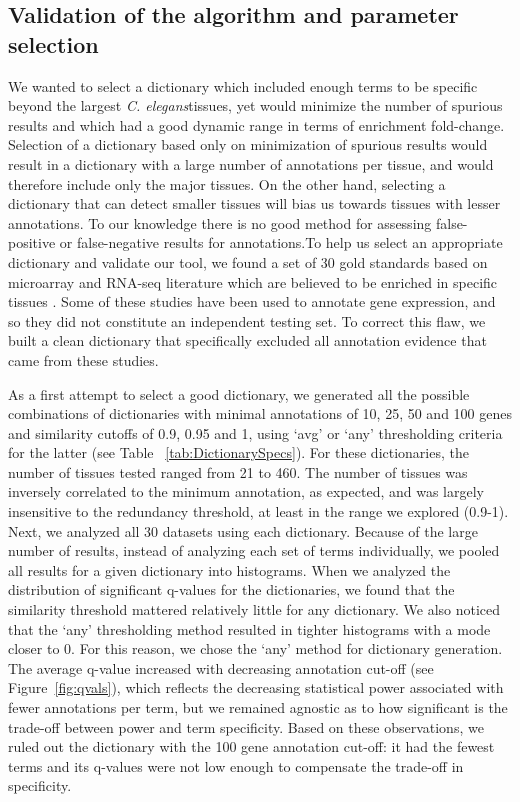 \documentclass[linenumbers, doublespacing]{bmcart}
\begin{document}
\subsection*{Validation of the algorithm and parameter selection}
	We wanted to select a dictionary which included enough terms to be specific beyond the largest  \emph{C. elegans}tissues, yet would minimize the number of spurious results and which had a good dynamic range in terms of enrichment fold-change. Selection of a dictionary based only on minimization of spurious results would result in a dictionary with a large number of annotations per tissue, and would therefore include only the major tissues. On the other hand, selecting a dictionary that can detect smaller tissues will bias us towards tissues with lesser annotations. To our knowledge there is no good method for assessing false-positive or false-negative results for annotations.To help us select an appropriate dictionary and validate our tool, we found a set of 30 gold standards based on microarray and RNA-seq literature which are believed to be enriched in specific tissues \cite{Gaudet2004a, Spencer2011, Cinar2005, Watson2008a, Pauli2006, Portman2004, Fox2007, Smith2010}. Some of these studies have been used to annotate gene expression, and so they did not constitute an independent testing set. To correct this flaw, we built a clean dictionary that specifically excluded all annotation evidence that came from these studies.

	As a first attempt to select a good dictionary, we generated all the possible combinations of dictionaries with minimal annotations of 10, 25, 50 and 100 genes and similarity cutoffs of 0.9, 0.95 and 1, using `avg' or `any' thresholding criteria for the latter (see Table ~\ref{tab:DictionarySpecs}). For these dictionaries, the number of tissues tested ranged from 21 to 460. The number of tissues was inversely correlated to the minimum annotation, as expected, and was largely insensitive to the redundancy threshold, at least in the range we explored (0.9-1). Next, we analyzed all 30 datasets using each dictionary. Because of the large number of results, instead of analyzing each set of terms individually, we pooled all results for a given dictionary into histograms. When we analyzed the distribution of significant q-values for the dictionaries, we found that the similarity threshold mattered relatively little for any dictionary. We also noticed that the `any' thresholding method resulted in tighter histograms with a mode closer to 0. For this reason, we chose the `any' method for dictionary generation. The average q-value increased with decreasing annotation cut-off (see Figure~\ref{fig:qvals}), which reflects the decreasing statistical power associated with fewer annotations per term, but we remained agnostic as to how significant is the trade-off between power and term specificity. Based on these observations, we ruled out the dictionary with the 100 gene annotation cut-off: it had the fewest terms and its q-values were not low enough to compensate the trade-off in specificity.
\end{document}
